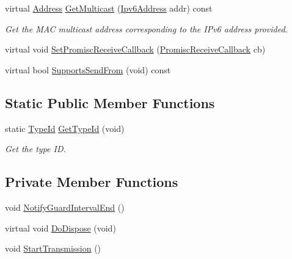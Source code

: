 \begin{DoxyCompactItemize}
virtual \hyperlink{classns3_1_1Address}{Address} \hyperlink{classns3_1_1AlohaNoackNetDevice_a3279afb4f10d41f26e5611f884364168}{Get\+Multicast} (\hyperlink{classns3_1_1Ipv6Address}{Ipv6\+Address} addr) const 
\begin{DoxyCompactList}\small\item\em Get the M\+AC multicast address corresponding to the I\+Pv6 address provided. \end{DoxyCompactList}\item 
virtual void \hyperlink{classns3_1_1AlohaNoackNetDevice_a6ba508fe9ad208d343c3be20694fd8a0}{Set\+Promisc\+Receive\+Callback} (\hyperlink{classns3_1_1NetDevice_a427225795919f26c414bee2ea3f31ed2}{Promisc\+Receive\+Callback} cb)
\item 
virtual bool \hyperlink{classns3_1_1AlohaNoackNetDevice_a135e8612b262a57b9db377b99f7e6a72}{Supports\+Send\+From} (void) const 
\end{DoxyCompactItemize}
\subsection*{Static Public Member Functions}
\begin{DoxyCompactItemize}
\item 
static \hyperlink{classns3_1_1TypeId}{Type\+Id} \hyperlink{classns3_1_1AlohaNoackNetDevice_a796a6c8182b1a6e3149407a7df561b05}{Get\+Type\+Id} (void)
\begin{DoxyCompactList}\small\item\em Get the type ID. \end{DoxyCompactList}\end{DoxyCompactItemize}
\subsection*{Private Member Functions}
\begin{DoxyCompactItemize}
\item 
void \hyperlink{classns3_1_1AlohaNoackNetDevice_a55c57df0647b2e9a8f35180434639c64}{Notify\+Guard\+Interval\+End} ()
\item 
virtual void \hyperlink{classns3_1_1AlohaNoackNetDevice_a3d07fd3426753994465218b0a453a078}{Do\+Dispose} (void)
\item 
void \hyperlink{classns3_1_1AlohaNoackNetDevice_a289a06303c625231c21b1d794fc3264b}{Start\+Transmission} ()
\end{DoxyCompactItemize}
